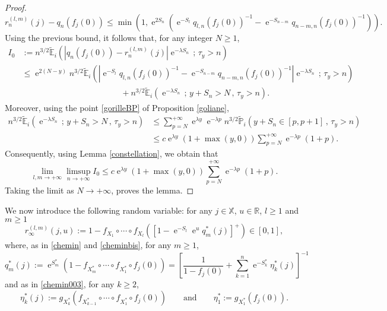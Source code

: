 \documentclass[12pt]{amsart}
\theoremstyle{definition}
\numberwithin{equation}{section}
\newcommand*{\abs}[1]{\left\lvert#1\right\rvert}
\def\bb#1{\mathbb{#1}}
\def\tbb#1{\tilde{\mathbb{#1}}}
\def\geq{\geqslant}
\def\leq{\leqslant}
\renewcommand\ll{\lambda}
\DeclareMathOperator{\e}{e}
\begin{document}
\begin{proof}
\[
r_n^{(l,m)}(j) - q_n\left( f_j(0) \right) \leq \min\left( 1,\e^{2S_n} \left( \e^{-S_l} q_{l,n}\left( f_j(0) \right)^{-1} - \e^{-S_{n-m}} q_{n-m,n}\left( f_j(0) \right)^{-1} \right) \right).
\]
Using the previous bound, it follows that, for any integer $N \geq 1$,
\begin{align*}
I_0 &:= n^{3/2} \tbb E_i \left( \abs{q_n\left( f_j(0) \right) - r_n^{(l,m)}(j)} \e^{-\ll S_n} \,;\, \tau_y > n \right) \\
&\leq \e^{2(N-y)} n^{3/2} \tbb E_i \left( \abs{\e^{-S_l} q_{l,n}\left( f_j(0) \right)^{-1} - \e^{-S_{n-m}} q_{n-m,n}\left( f_j(0) \right)^{-1}} \e^{-\ll S_n} \,;\, \tau_y > n \right) \\
&\hspace{5cm} + n^{3/2} \tbb E_i \left( \e^{-\ll S_n} \,;\, y+S_n > N \,,\, \tau_y > n \right). 
\end{align*}
Moreover, using the point \ref{gorilleBP} of Proposition \ref{goliane},
\begin{align*}
n^{3/2} \tbb E_i \left( \e^{-\ll S_n} \,;\, y+S_n > N \,,\, \tau_y > n \right) &\leq \sum_{p=N}^{+\infty} \e^{\ll y} \e^{-\ll p} n^{3/2} \tbb P_i \left( y+S_n \in [p,p+1] \,,\, \tau_y > n \right) \\
&\leq c \e^{\ll y} (1+\max(y,0)) \sum_{p=N}^{+\infty} \e^{-\ll p} (1+p).
\end{align*}
Consequently, using Lemma \ref{constellation}, we obtain that
\[
\lim_{l,m \to +\infty} \limsup_{n\to+\infty} I_0 \leq c \e^{\ll y} (1+\max(y,0)) \sum_{p=N}^{+\infty} \e^{-\ll p} (1+p).
\]
Taking the limit as $N \to +\infty$, proves the lemma.
\end{proof}

We now introduce the following random variable: for any $j \in \bb X$, $u \in \bb R$, $l \geq 1$ and $m \geq 1$
\[
r_{\infty}^{(l,m)}(j,u) := 1-f_{X_1} \circ \cdots \circ f_{X_l} \left( \left[ 1- \e^{-S_l} \e^{u} q_m^*(j) \right]^+ \right) \in [0,1],
\]
where, as in \eqref{chemin} and \eqref{cheminbis}, for any $m \geq 1$,
\[
q_m^*(j) := \e^{S_m^*} \left( 1- f_{X_m^*} \circ \cdots \circ f_{X_1^*} \circ f_j (0) \right) = \left[ \frac{1}{1-f_j(0)} + \sum_{k=1}^{n} \e^{-S_k^*} \eta_k^*(j) \right]^{-1}
\]
and as in \eqref{chemin003}, for any $k \geq 2$,
\[
\eta_k^*(j) := g_{X_k^*} \left( f_{X_{k-1}^*} \circ \cdots \circ f_{X_1^*} \circ f_j (0) \right) \qquad \text{and} \qquad \eta_1^* := g_{X_1^*} \left( f_j(0) \right).
\]
\end{document}
